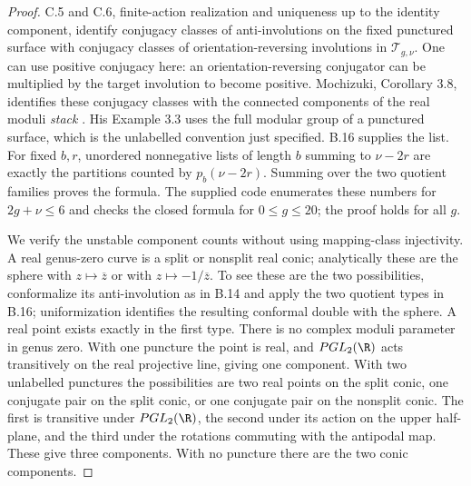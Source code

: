 \begin{proof}
C.5 and C.6, finite-action realization and uniqueness up to the identity component, identify
conjugacy classes of anti-involutions on the fixed punctured surface with
conjugacy classes of orientation-reversing involutions in
$\mathcal T_{g,\nu}$. One can use positive conjugacy here: an orientation-reversing
conjugator can be multiplied by the target involution to become positive.
Mochizuki, Corollary 3.8, identifies these conjugacy classes with the connected
components of the real moduli \emph{stack} \cite{bMochizuki2003}. His Example 3.3
uses the full modular group of a punctured surface, which is the unlabelled
convention just specified. B.16 supplies the list. For fixed $b,r$, unordered
nonnegative lists of length $b$ summing to $\nu-2r$ are exactly the partitions
counted by $p_b(\nu-2r)$. Summing over the two quotient families proves the
formula. The supplied code enumerates these numbers for $2g+\nu\le6$ and checks
the closed formula for $0\le g\le20$; the proof holds for all $g$.

We verify the unstable component counts without using mapping-class
injectivity. A real genus-zero curve is a split or nonsplit real conic;
analytically these are the sphere with $z\mapsto\overline z$ or with
$z\mapsto-1/\overline z$. To see these are the two possibilities,
conformalize its anti-involution as in B.14 and apply the two quotient
types in B.16; uniformization identifies the resulting conformal
double with the sphere. A real point exists exactly in the first type.
There is no complex moduli parameter in genus zero. With one puncture
the point is real, and $PGL_2(\R)$ acts transitively on the real
projective line, giving one component. With two unlabelled punctures
the possibilities are two real points on the split conic, one
conjugate pair on the split conic, or one conjugate pair on the
nonsplit conic. The first is transitive under $PGL_2(\R)$, the second
under its action on the upper half-plane, and the third under the
rotations commuting with the antipodal map. These give three
components. With no puncture there are the two conic components.


\end{proof}
